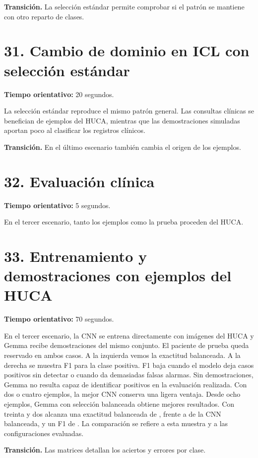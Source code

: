 \documentclass[11pt,a4paper]{article}
\begin{document}
\textbf{Transición.} La selección estándar permite comprobar si el patrón se mantiene con otro reparto de clases.

\section*{31. Cambio de dominio en ICL con selección estándar}
\textbf{Tiempo orientativo: }20 segundos.

La selección estándar reproduce el mismo patrón general. Las consultas clínicas se benefician de ejemplos del HUCA, mientras que las demostraciones simuladas aportan poco al clasificar los registros clínicos.

\textbf{Transición.} En el último escenario también cambia el origen de los ejemplos.

\section*{32. Evaluación clínica}
\textbf{Tiempo orientativo: }5 segundos.

En el tercer escenario, tanto los ejemplos como la prueba proceden del HUCA.

\section*{33. Entrenamiento y demostraciones con ejemplos del HUCA}
\textbf{Tiempo orientativo: }70 segundos.

En el tercer escenario, la CNN se entrena directamente con imágenes del HUCA y Gemma recibe demostraciones del mismo conjunto. El paciente de prueba queda reservado en ambos casos. A la izquierda vemos la exactitud balanceada. A la derecha se muestra F1 para la clase positiva. F1 baja cuando el modelo deja casos positivos sin detectar o cuando da demasiadas falsas alarmas. Sin demostraciones, Gemma no resulta capaz de identificar positivos en la evaluación realizada. Con dos o cuatro ejemplos, la mejor CNN conserva una ligera ventaja. Desde ocho ejemplos, Gemma con selección balanceada obtiene mejores resultados. Con treinta y dos alcanza una exactitud balanceada de \RealVlmBA{}, frente a \RealCnnLastBA{} de la CNN balanceada, y un F1 de \RealVlmFone{}. La comparación se refiere a esta muestra y a las configuraciones evaluadas.

\textbf{Transición.} Las matrices detallan los aciertos y errores por clase.
\end{document}
